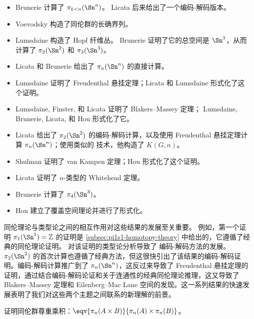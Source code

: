 {\begin{itemize}
  \item
  Brunerie 计算了 $\pi_{k<n}(\Sn ^ n)$。
  Licata 后来给出了一个编码-解码版本。

  \item Voevodsky 构造了同伦群的长确界列。

  \item Lumsdaine 构造了 Hopf 纤维丛。
  Brunerie 证明了它的总空间是 $\Sn ^3$，从而计算了 $\pi_2(\Sn ^2)$ 和
  $\pi_3(\Sn ^3)$。

  \item Licata 和 Brunerie 给出了
  $\pi_n(\Sn ^n)$ 的直接计算。

  \item
  Lumsdaine 证明了 Freudenthal 悬挂定理；Licata 和
  Lumsdaine 形式化了这个证明。
  \item Lumsdaine, Finster, 和 Licata 证明了 Blakers--Massey 定理；
  Lumsdaine, Brunerie, Licata, 和 Hou 形式化了它。

  \item
  Licata 给出了 $\pi_2(\Sn ^2)$ 的编码-解码计算，以及使用 Freudenthal 悬挂定理计算 $\pi_n(\Sn ^n)$；使用类似的
  技术，他构造了 $K(G,n)$。

  \item
  Shulman 证明了 van Kampen 定理；Hou 形式化了这个证明。

  \item
  Licata 证明了 $n$-类型的 Whitehead 定理。

  \item Brunerie 计算了 $\pi_4(\Sn ^3)$。

  \item
  Hou 建立了覆盖空间理论并进行了形式化。
\end{itemize}

同伦理论与类型论之间的相互作用对这些结果的发展至关重要。
例如，第一个证明
$\pi_1(\Sn ^1)=\mathbb{Z}$ 的证明是 \cref{subsec:pi1s1-homotopy-theory} 中给出的，它遵循了经典的同伦理论证明。
对该证明的类型论分析导致了
编码-解码方法的发展。
$\pi_2(\Sn ^2)$ 的首次计算也遵循了经典方法，但这很快引出了该结果的编码-解码证明。编码-解码计算推广到了 $\pi_n(\Sn ^n)$，这反过来导致了 Freudenthal 悬挂定理的证明，通过结合编码-解码论证和关于连通性的经典同伦理论推理，这又导致了 Blakers--Massey 定理和 Eilenberg--Mac Lane 空间的发现。这一系列结果的快速发展表明了我们对这些两个主题之间联系的新理解的前景。

\sectionExercises

\begin{ex}\label{ex:homotopy-groups-resp-prod}
证明同伦群尊重乘积：$\eqv{\pi_n(A\times B)}{\pi_n(A)\times \pi_n(B)}$。
\end{ex}

}
